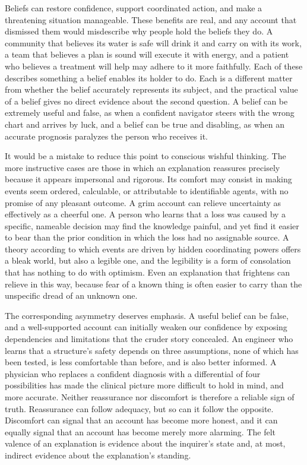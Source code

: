 \documentclass[11pt,letterpaper]{article}
\theoremstyle{definition}
\begin{document}
Beliefs can restore confidence, support coordinated action, and make a threatening situation manageable. These benefits are real, and any account that dismissed them would misdescribe why people hold the beliefs they do. A community that believes its water is safe will drink it and carry on with its work, a team that believes a plan is sound will execute it with energy, and a patient who believes a treatment will help may adhere to it more faithfully. Each of these describes something a belief enables its holder to do. Each is a different matter from whether the belief accurately represents its subject, and the practical value of a belief gives no direct evidence about the second question. A belief can be extremely useful and false, as when a confident navigator steers with the wrong chart and arrives by luck, and a belief can be true and disabling, as when an accurate prognosis paralyzes the person who receives it.

It would be a mistake to reduce this point to conscious wishful thinking. The more instructive cases are those in which an explanation reassures precisely because it appears impersonal and rigorous. Its comfort may consist in making events seem ordered, calculable, or attributable to identifiable agents, with no promise of any pleasant outcome. A grim account can relieve uncertainty as effectively as a cheerful one. A person who learns that a loss was caused by a specific, nameable decision may find the knowledge painful, and yet find it easier to bear than the prior condition in which the loss had no assignable source. A theory according to which events are driven by hidden coordinating powers offers a bleak world, but also a legible one, and the legibility is a form of consolation that has nothing to do with optimism. Even an explanation that frightens can relieve in this way, because fear of a known thing is often easier to carry than the unspecific dread of an unknown one.

The corresponding asymmetry deserves emphasis. A useful belief can be false, and a well-supported account can initially weaken our confidence by exposing dependencies and limitations that the cruder story concealed. An engineer who learns that a structure's safety depends on three assumptions, none of which has been tested, is less comfortable than before, and is also better informed. A physician who replaces a confident diagnosis with a differential of four possibilities has made the clinical picture more difficult to hold in mind, and more accurate. Neither reassurance nor discomfort is therefore a reliable sign of truth. Reassurance can follow adequacy, but so can it follow the opposite. Discomfort can signal that an account has become more honest, and it can equally signal that an account has become merely more alarming. The felt valence of an explanation is evidence about the inquirer's state and, at most, indirect evidence about the explanation's standing.
\end{document}
